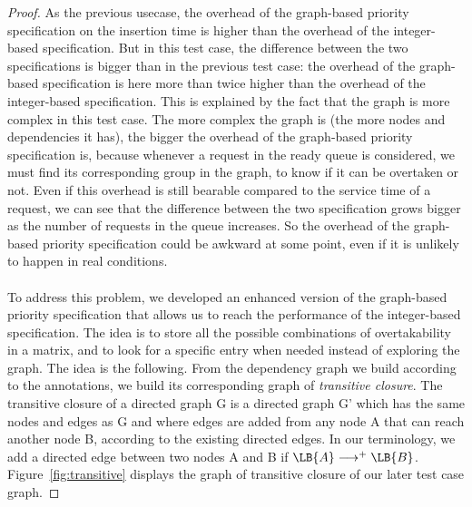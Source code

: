 \documentclass[11pt]{report}
\begin{document}
\begin{proof}
As the previous usecase, the overhead of the graph-based priority specification on the insertion time is higher than the overhead of the integer-based specification. But in this test case, the difference between the two specifications is bigger than in the previous test case: the overhead of the graph-based specification is here more than twice higher than the overhead of the integer-based specification.
This is explained by the fact that the graph is more complex in this test case. The more complex the graph is (the more nodes and dependencies it has), the bigger the overhead of the graph-based priority specification is, because whenever a request in the ready queue is considered, we must find its corresponding group in the graph, to know if it can be overtaken or not.
Even if this overhead is still bearable compared to the service time of a request, we can see that the difference between the two specification grows bigger as the number of requests in the queue increases. So the overhead of the graph-based priority specification could be awkward at some point, even if it is unlikely to happen in real conditions.

\paragraph{}
To address this problem, we developed an enhanced version of the graph-based priority specification that allows us to reach the performance of the integer-based specification. The idea is to store all the possible combinations of overtakability in a matrix, and to look for a specific entry when needed instead of exploring the graph. 
The idea is the following. From the dependency graph we build according to the annotations, we build its corresponding graph of \emph{transitive closure}. The transitive closure of a directed graph G is a directed graph G' which has the same nodes and edges as G and where edges are added from any node A that can reach another node B, according to the existing directed edges. In our terminology, we add a directed edge between two nodes A and B if $\LB{A}\longrightarrow^{+}\LB{B}$. Figure~\ref{fig:transitive} displays the graph of transitive closure of our later test case graph.


\end{proof}
\end{document}
